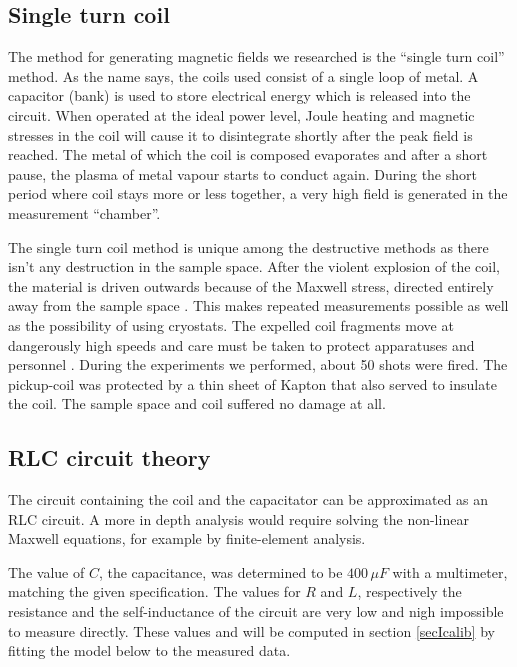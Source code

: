 \subsection{Single turn coil}

The method for generating magnetic fields we researched is the ``single 
turn coil'' method. As the name says, the coils used consist of a single 
loop of metal. A capacitor (bank) is used to store electrical energy which 
is released into the circuit. When operated at the ideal power level, Joule 
heating and magnetic stresses in the coil will cause it to disintegrate 
shortly after the peak field is reached. The metal of which the coil is 
composed evaporates  and after a short pause, the plasma of metal vapour 
starts to conduct again. During the short period where coil stays more or 
less together, a very high field is generated in the measurement 
``chamber''. 

The single turn coil method is unique among the destructive methods as 
there isn't any destruction in the sample space. After the violent 
explosion of the coil, the material is driven outwards because of the 
Maxwell stress, directed entirely away from the sample space 
\cite{herlachArticle}.  This makes repeated measurements possible as well 
as the possibility of using cryostats. The expelled coil fragments move at 
dangerously high speeds and care must be taken to protect apparatuses and 
personnel \cite{singleTurn}. During the experiments we performed, about 50 
shots were fired. The pickup-coil was protected by a thin sheet of Kapton 
that also served to insulate the coil. The sample space and coil suffered 
no damage at all.

\subsection{RLC circuit theory}

The circuit containing the coil and the capacitator can be approximated as an 
RLC circuit. A more in depth analysis would require solving the non-linear 
Maxwell equations, for example by finite-element 
analysis.\cite{herlachArticle}

The value of $C$, the capacitance, was determined to be $400\,\mu F$ with a 
multimeter, matching the given specification. The values for $R$ and $L$, 
respectively the resistance and the self-inductance of the circuit are very low 
and nigh impossible to measure directly. These values and will be computed in 
section \ref{secIcalib} by fitting the model below to the measured data.

